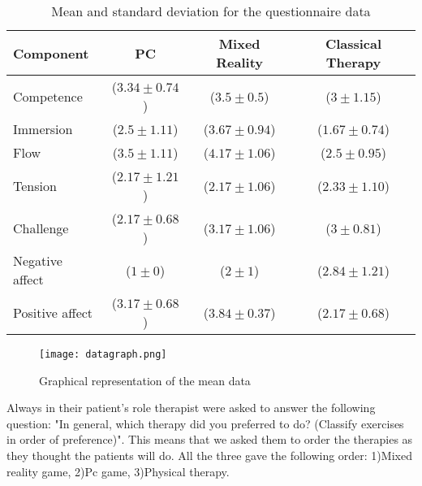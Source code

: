 \documentclass[preprint,authoryear,12pt]{elsarticle}
\begin{document}
\begin{table}[h]
\caption{Mean and standard deviation for the questionnaire data}
\center
\label{fig:fuma}
\begin{tabular}{|l|c|c|c|}
\hline
Component & PC & Mixed Reality & Classical Therapy \\
\hline
Competence & 	($3.34 \pm 0.74$) & 	($3.5 \pm 0.5$) & 	($3 \pm 1.15$) \\
Immersion & 	($2.5 \pm 1.11$) & 	($3.67 \pm 0.94$) & 	($1.67 \pm 0.74$) \\
Flow & 		($3.5 \pm 1.11$) & 	($4.17 \pm 1.06$) & 	($2.5 \pm 0.95$)\\
Tension & 		($2.17 \pm 1.21$) & 	($2.17 \pm 1.06$) & 	($2.33 \pm 1.10$) \\
Challenge & 	($2.17 \pm 0.68$) & 	($3.17 \pm 1.06$) & 	($3 \pm 0.81$) \\
Negative affect&	($1 \pm 0$) & 		($2 \pm 1$) & 		($2.84 \pm 1.21$) \\
Positive affect &	($3.17 \pm 0.68$) & 	($3.84 \pm 0.37$) & 	($2.17 \pm 0.68$) \\
\hline
\end{tabular}
\end{table}




\begin{figure}[h]
	\centering
		\texttt{[image: datagraph.png]}
	\caption{Graphical representation of the mean data}
	\label{fig:graph}
\end{figure}


Always in their patient's role therapist were asked to answer the following question: "In general, which therapy did you preferred to do? (Classify exercises in order of preference)".	
This means that we asked them to order the therapies as they thought the patients will do.
All the three gave the following order: 1)Mixed reality game,  2)Pc game,	3)Physical therapy.
\end{document}
